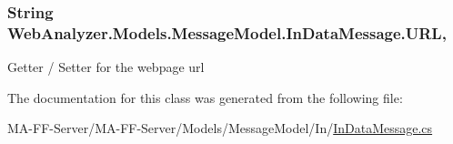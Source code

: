 \subsubsection[{U\+R\+L}]{\setlength{\rightskip}{0pt plus 5cm}String Web\+Analyzer.\+Models.\+Message\+Model.\+In\+Data\+Message.\+U\+R\+L\hspace{0.3cm}{\ttfamily [get]}, {\ttfamily [set]}}\label{class_web_analyzer_1_1_models_1_1_message_model_1_1_in_data_message_a16e5e70d5df3ff7cf9c32793809c9beb}


Getter / Setter for the webpage url 



The documentation for this class was generated from the following file\+:\begin{DoxyCompactItemize}
\item 
M\+A-\/\+F\+F-\/\+Server/\+M\+A-\/\+F\+F-\/\+Server/\+Models/\+Message\+Model/\+In/\hyperlink{_in_data_message_8cs}{In\+Data\+Message.\+cs}\end{DoxyCompactItemize}

